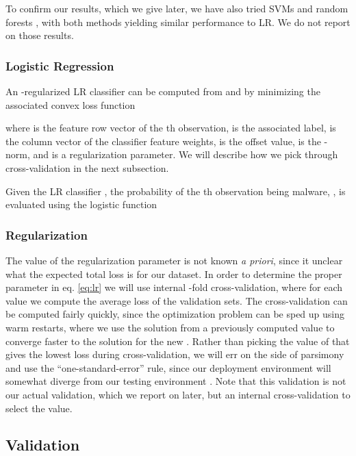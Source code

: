 \documentclass{sig-alternate-2013}
\newcommand{\apriori}{\emph{a priori}\xspace}
\begin{document}
To confirm our results, which we give later, we have also tried SVMs and random forests \cite{shalev2014understanding}, with both methods yielding similar performance to LR. We do not report on those results.

\subsubsection{Logistic Regression}

An -regularized LR classifier can be computed from  and  by minimizing the associated convex loss function

where  is the feature row vector of the th observation,  is the associated label,  is the column vector of the classifier feature weights,  is the offset value,  is the -norm, and  is a regularization parameter. We will describe how we pick  through cross-validation in the next subsection.

Given the LR classifier , the probability of the th observation being malware, ,  is evaluated using the logistic function

 
\subsubsection{Regularization}

The value of the regularization parameter  is not known \apriori, since it unclear what the expected total loss is for our dataset. In order to determine the proper  parameter in eq. \eqref{eq:lr} we will use internal -fold cross-validation, where for each  value we compute the average loss of the validation sets. The cross-validation can be computed fairly quickly, since the optimization problem can be sped up using warm restarts, where we use the solution from a previously computed  value to converge faster to the solution for the new  \cite{friedman2regularization}. Rather than picking the value of  that gives the lowest loss during cross-validation, we will err on the side of parsimony and use the ``one-standard-error'' rule, since our deployment environment will somewhat diverge from our testing environment \cite{friedman2regularization}. Note that this validation is not our actual validation, which we report on later, but an internal cross-validation to select the  value.

\subsection{Validation}
\end{document}
